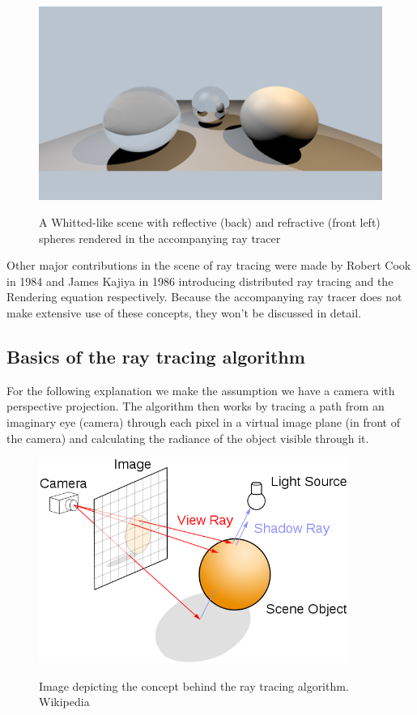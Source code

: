 \documentclass{article}
\begin{document}
\begin{figure}
    \caption{A Whitted-like scene with reflective (back) and refractive (front left) spheres rendered in the accompanying ray tracer}
    \includegraphics[width=1.0\textwidth]{whitted_example}
    \label{fig:whitted_example}
\end{figure}

Other major contributions in the scene of ray tracing were made by Robert Cook in 1984 \cite{cook} and James Kajiya in 1986 \citep{kajiya} introducing distributed ray tracing and the Rendering equation respectively. Because the accompanying ray tracer does not make extensive use of these concepts, they won't be discussed in detail.

\subsection{Basics of the ray tracing algorithm}
For the following explanation we make the assumption we have a camera with perspective projection. The algorithm then works by tracing a path from an imaginary eye (camera) through each pixel in a virtual image plane (in front of the camera) and calculating the radiance of the object visible through it. 

\begin{figure}
    \caption{Image depicting the concept behind the ray tracing algorithm. Wikipedia}
    \includegraphics[width=0.9\textwidth]{ray_trace_algo}
    \label{fig:concept}
\end{figure}
\end{document}
